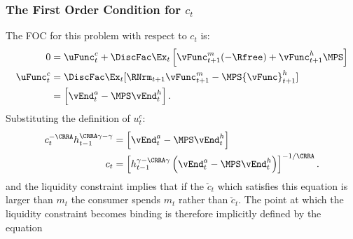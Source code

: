 \documentclass[titlepage, headings=optiontotocandhead]{\econtex}
\begin{document}
{  \subsubsection{The First Order Condition for ${c}_{t}$}
  The FOC for this problem with respect to ${c}_{t}$ is:
  \begin{equation}\begin{gathered}\begin{aligned}
        0  & = \uFunc^{c}_{t} + \DiscFac \Ex_{t} \left[{\vFunc}^{m}_{t+1}(-\Rfree)+{\vFunc}^{h}_{t+1} \MPS\right]  \\
        \uFunc^{c}_{t}  & = \DiscFac \Ex_{t} [\RNrm_{t+1} {\vFunc}_{t+1}^{m}-\MPS {\vFunc}_{t+1}^{h}] \label{eq:ctfoc}
        \\            & = \left[\vEnd_{t}^{{a}}-\MPS \vEnd_{t}^{h} \right].
      \end{aligned}\end{gathered}\end{equation}
  Substituting the definition of $u_{t}^{c}$:
  \begin{equation}\begin{gathered}\begin{aligned}
        {c}_{t}^{-\CRRA}h_{t-1}^{\CRRA\gamma-\gamma}  & = \left[\vEnd_{t}^{{a}}-\MPS \vEnd_{t}^{h} \right]
        \\  {c}_{t}                                     & = \left[h_{t-1}^{\gamma-\CRRA\gamma} \left(\vEnd_{t}^{{a}}-\MPS \vEnd_{t}^{h} \right) \right]^{-1/\CRRA} \label{eq:habitsfoc}.
      \end{aligned}\end{gathered}\end{equation}
  and the liquidity constraint implies that if the $\check{c}_{t}$ which
  satisfies this equation is larger than ${m}_{t}$ the consumer spends
  ${m}_{t}$ rather than $\check{c}_{t}$.  The point at which the liquidity
  constraint becomes binding is therefore implicitly defined by the equation
}
\end{document}
